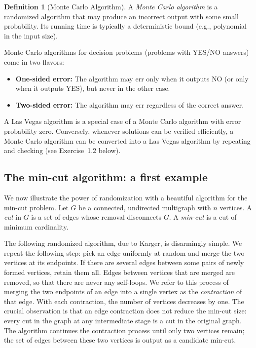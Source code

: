\documentclass[twoside,12pt]{book}
\theoremstyle{plain}
\theoremstyle{definition}
\newtheorem{definition}[theorem]{Definition}
\theoremstyle{remark}
\begin{document}
\begin{definition}[Monte Carlo Algorithm]
A \emph{Monte Carlo algorithm} is a randomized algorithm that may produce an
incorrect output with some small probability. Its running time is typically
a deterministic bound (e.g., polynomial in the input size).
\end{definition}

Monte Carlo algorithms for decision problems (problems with YES/NO answers)
come in two flavors:
\begin{itemize}
\item \textbf{One-sided error:} The algorithm may err only when it outputs
NO (or only when it outputs YES), but never in the other case.
\item \textbf{Two-sided error:} The algorithm may err regardless of the
correct answer.
\end{itemize}

A Las Vegas algorithm is a special case of a Monte Carlo algorithm with
error probability zero. Conversely, whenever solutions can be verified
efficiently, a Monte Carlo algorithm can be converted into a Las Vegas
algorithm by repeating and checking (see Exercise~1.2 below).

\subsection{The min-cut algorithm: a first example}

We now illustrate the power of randomization with a beautiful algorithm for
the min-cut problem. Let $G$ be a connected, undirected multigraph with $n$
vertices. A \emph{cut} in $G$ is a set of edges whose removal disconnects
$G$. A \emph{min-cut} is a cut of minimum cardinality.

The following randomized algorithm, due to Karger, is disarmingly simple.
We repeat the following step: pick an edge uniformly at random and merge the
two vertices at its endpoints. If there are several edges between some pairs
of newly formed vertices, retain them all. Edges between vertices that are
merged are removed, so that there are never any self-loops. We refer to this
process of merging the two endpoints of an edge into a single vertex as the
\emph{contraction} of that edge. With each contraction, the number of
vertices decreases by one. The crucial observation is that an edge
contraction does not reduce the min-cut size: every cut in the graph at any
intermediate stage is a cut in the original graph. The algorithm continues
the contraction process until only two vertices remain; the set of edges
between these two vertices is output as a candidate min-cut.
\end{document}
